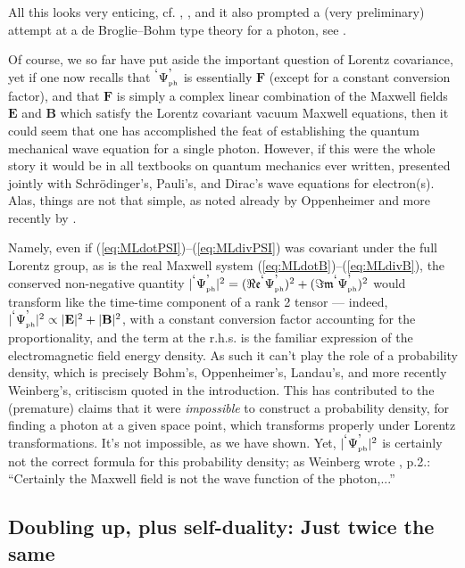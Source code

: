 \documentclass[11pt]{article}
\theoremstyle{definition}
\newcommand{\refeq}[1]{(\ref{#1})}
\numberwithin{equation}{section}
\newcommand{\fe}{\mathfrak{e}}
\newcommand{\fm}{\mathfrak{m}}
\newcommand{\bB}{\mathbf{B}}
\newcommand{\bE}{\mathbf{E}}
\newcommand{\bF}{\mathbf{F}}
\newcommand{\PsiPh}{{}^{\mbox{\textrm{`}}}{\Psi_{\mbox{\rm\tiny ph}}^{\mbox{\textrm{'}}}}}
\begin{document}
\noindent
 All this looks very enticing, cf. \cite{SmithRaymer}, \cite{Chandrasekar}, and it also prompted 
a (very preliminary) attempt at a de Broglie--Bohm type theory for a photon, see \cite{Esposito}.

 Of course, we so far have put aside the important question of Lorentz covariance, yet if one now recalls that $\PsiPh$ is essentially
$\bF$ (except for a constant conversion factor), and that $\bF$ is simply a complex linear combination of the Maxwell fields $\bE$ and $\bB$
which satisfy the Lorentz covariant vacuum Maxwell equations, then it could seem that one has accomplished the feat of establishing
the quantum mechanical wave equation for  a single photon. 
  However, if this were the whole story it would be in all textbooks on quantum mechanics ever written, presented jointly with Schr\"odinger's,
Pauli's,  and Dirac's wave equations for electron(s). 
 Alas, things are not that simple, as noted already by Oppenheimer \cite{OppiPHOTON} and more recently by \cite{Cugnon}.

 Namely, even if \refeq{eq:MLdotPSI}--\refeq{eq:MLdivPSI} was covariant under the full Lorentz group, as is
the real Maxwell system \refeq{eq:MLdotB}--\refeq{eq:MLdivB}, the conserved non-negative quantity 
$|\PsiPh|^2 = (\Re\fe\PsiPh)^2 + (\Im\fm\PsiPh)^2$ would transform like the time-time component of a rank 2 tensor --- indeed,
$|\PsiPh|^2 \propto |\bE|^2 + |\bB|^2$, with a constant conversion factor accounting for the proportionality, and the term at
the r.h.s. is the familiar expression of the electromagnetic field energy density. 
 As such it can't play the role of a probability density, 
which is precisely Bohm's, Oppenheimer's, Landau's, and more recently Weinberg's, critiscism quoted in the introduction.
 This has contributed to the (premature) claims that it were \emph{impossible} to construct a probability 
density, for finding a photon at a given space point, which transforms properly under Lorentz transformations.
 It's not impossible, as we have shown.
 Yet, $|\PsiPh|^2$ is certainly not the correct formula for this probability density;
as Weinberg wrote \cite{WeinbergTALK}, p.2.: ``Certainly the Maxwell field is not the wave function of the photon,...'' 

\subsection{Doubling up, plus self-duality: Just twice the same}\label{sec:selfDUAL}
\end{document}
